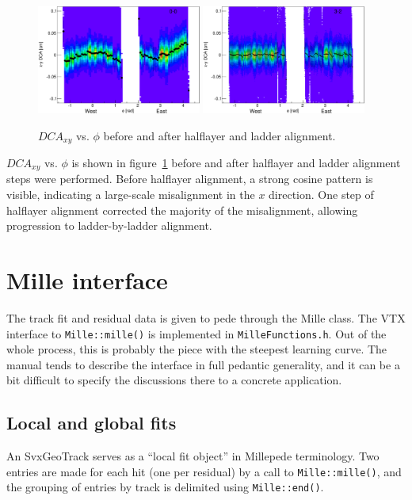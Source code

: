 \documentclass[12pt]{article}
\begin{document}
\begin{figure}[htb]
  \begin{center}
    \includegraphics[width=0.48\textwidth]{1/xydca_vs_phi_0}
    \quad
    \includegraphics[width=0.48\textwidth]{31vs32/xydca_vs_phi_1}
  \end{center}
  \caption{$DCA_{xy}$ vs. $\phi$ before and after halflayer and ladder alignment.}
  \label{fig:dcavsphi}
\end{figure}
$DCA_{xy}$ vs. $\phi$ is shown in figure~\ref{fig:dcavsphi} before and after halflayer and ladder alignment steps were performed. Before halflayer alignment, a strong cosine pattern is visible, indicating a large-scale misalignment in the $x$ direction. One step of halflayer alignment corrected the majority of the misalignment, allowing progression to ladder-by-ladder alignment.

\section{Mille interface}
The track fit and residual data is given to pede through the Mille class. The VTX interface to \texttt{Mille::mille()} is implemented in \texttt{MilleFunctions.h}. Out of the whole process, this is probably the piece with the steepest learning curve. The manual tends to describe the interface in full pedantic generality, and it can be a bit difficult to specify the discussions there to a concrete application.

\subsection{Local and global fits}
An SvxGeoTrack serves as a ``local fit object'' in Millepede terminology. Two entries are made for each hit (one per residual) by a call to \texttt{Mille::mille()}, and the grouping of entries by track is delimited using \texttt{Mille::end()}.
\end{document}
